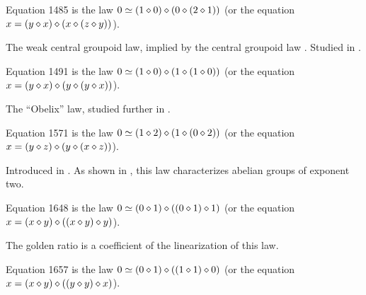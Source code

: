 \begin{definition}[Equation 1485]\label{eq1485}\leanok{}  Equation 1485 is the law $0 \simeq  (1 \diamond 0) \diamond (0 \diamond (2 \diamond 1))$ (or the equation $x = (y \diamond x) \diamond (x \diamond (z \diamond y))$).
\end{definition}

The weak central groupoid law, implied by the central groupoid law . Studied in .

\begin{definition}[Equation 1491]\label{eq1491}\leanok{}  Equation 1491 is the law $0 \simeq  (1 \diamond 0) \diamond (1 \diamond (1 \diamond 0))$ (or the equation $x = (y \diamond x) \diamond (y \diamond (y \diamond x))$).
\end{definition}

The ``Obelix'' law, studied further in .

\begin{definition}[Equation 1571]\label{eq1571}\leanok{}  Equation 1571 is the law $0 \simeq  (1 \diamond 2) \diamond (1 \diamond (0 \diamond 2))$ (or the equation $x = (y \diamond z) \diamond (y \diamond (x \diamond z))$).
\end{definition}

Introduced in \cite{mendelsohn-padmanabhan}.  As shown in , this law characterizes abelian groups of exponent two.

\begin{definition}[Equation 1648]\label{eq1648}\leanok{}  Equation 1648 is the law $0 \simeq  (0 \diamond 1) \diamond ((0 \diamond 1) \diamond 1)$ (or the equation $x = (x \diamond y) \diamond ((x \diamond y) \diamond y)$).
\end{definition}

The golden ratio is a coefficient of the linearization of this law.

\begin{definition}[Equation 1657]\label{eq1657}\leanok{}  Equation 1657 is the law $0 \simeq  (0 \diamond 1) \diamond ((1 \diamond 1) \diamond 0)$ (or the equation $x = (x \diamond y) \diamond ((y \diamond y) \diamond x)$).
\end{definition}

